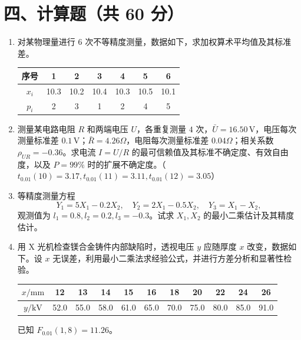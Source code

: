 \documentclass[UTF8,12pt,a4paper]{ctexart}
\begin{document}
\section*{四、计算题（共 60 分）}
\begin{enumerate}[label=\arabic*、]
\item 对某物理量进行 $6$ 次不等精度测量，数据如下，求加权算术平均值及其标准差。
\begin{center}
\begin{tabular}{c|cccccc}
\toprule
序号 & 1&2&3&4&5&6\\
\midrule
$x_i$ & 10.3&10.2&10.4&10.3&10.5&10.1\\
$p_i$ & 2&3&1&2&4&5\\
\bottomrule
\end{tabular}
\end{center}

\vspace{1.5cm}

\item 测量某电路电阻 $R$ 和两端电压 $U$，各重复测量 $4$ 次，$\bar{U}=16.50\,\mathrm{V}$，电压每次测量标准差 $0.1\,\mathrm{V}$；$\bar{R}=4.26\Omega$，电阻每次测量标准差 $0.04\Omega$；相关系数 $\rho_{UR}=-0.36$。求电流 $I=U/R$ 的最可信赖值及其标准不确定度、有效自由度，以及 $P=99\%$ 时的扩展不确定度。（$t_{0.01}(10)=3.17,t_{0.01}(11)=3.11,t_{0.01}(12)=3.05$）

\vspace{1.5cm}

\item 等精度测量方程
\begin{equation*}
Y_1=5X_1-0.2X_2,
\quad Y_2=2X_1-0.5X_2,
\quad Y_3=X_1-X_2,
\end{equation*}
观测值为 $l_1=0.8,l_2=0.2,l_3=-0.3$。试求 $X_1,X_2$ 的最小二乘估计及其精度估计。

\vspace{1.5cm}

\item 用 X 光机检查镁合金铸件内部缺陷时，透视电压 $y$ 应随厚度 $x$ 改变，数据如下。设 $x$ 无误差，利用最小二乘法求经验公式，并进行方差分析和显著性检验。
\begin{center}
\begin{tabular}{c|cccccccccc}
\toprule
$x/\mathrm{mm}$&12&13&14&15&16&18&20&22&24&26\\
\midrule
$y/\mathrm{kV}$&52.0&55.0&58.0&61.0&65.0&70.0&75.0&80.0&85.0&91.0\\
\bottomrule
\end{tabular}
\end{center}
已知 $F_{0.01}(1,8)=11.26$。
\end{enumerate}
\end{document}
